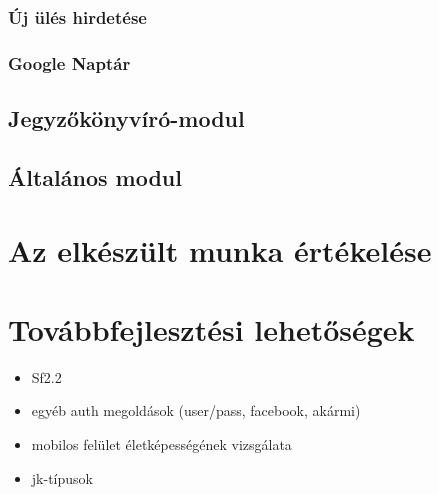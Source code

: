 \documentclass[a4paper,12pt,oneside]{report}
\begin{document}
\subsubsection*{Új ülés hirdetése}

\subsubsection*{Google Naptár}


\subsection{Jegyzőkönyvíró-modul}

\subsection{Általános modul}


\section{Az elkészült munka értékelése}


\section{Továbbfejlesztési lehetőségek}


\begin{itemize}
  \item Sf2.2
  \item egyéb auth megoldások (user/pass, facebook, akármi)
  \item mobilos felület életképességének vizsgálata
  \item jk-típusok
\end{itemize}

\renewcommand{\bibname}{Irodalomjegyzék}


\end{document}
